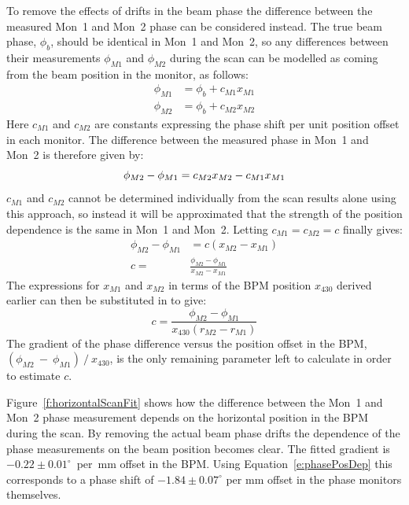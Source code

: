 To remove the effects of drifts in the beam phase the difference between the measured Mon~1 and Mon~2 phase can be considered instead. The true beam phase, \(\phi_b\), should be identical in Mon~1 and Mon~2, so any differences between their measurements \(\phi_{M1}\) and \(\phi_{M2}\) during the scan can be modelled as coming from the beam position in the monitor, as follows:
\begin{align}
\phi_{M1} &= \phi_b + c_{M1}x_{M1} \\
\phi_{M2} &= \phi_b + c_{M2}x_{M2}
\end{align}
Here \(c_{M1}\) and \(c_{M2}\) are constants expressing the phase shift per unit position offset in each monitor. The difference between the measured phase in Mon~1 and Mon~2 is therefore given by:
\begin{equation}
\phi_{M2}-\phi_{M1} = c_{M2}x_{M2} - c_{M1}x_{M1} \\
\end{equation}
\(c_{M1}\) and \(c_{M2}\) cannot be determined individually from the scan results alone using this approach, so instead it will be approximated that the strength of the position dependence is the same in Mon~1 and Mon~2. Letting \(c_{M1} = c_{M2} = c\) finally gives:
\begin{align}
\phi_{M2}-\phi_{M1} &= c(x_{M2}-x_{M1}) \\
c = &\frac{\phi_{M2}-\phi_{M1}}{x_{M2}-x_{M1}} 
\end{align}
The expressions for \(x_{M1}\) and \(x_{M2}\) in terms of the BPM position \(x_{430}\) derived earlier can then be substituted in to give:
\begin{equation}
c = \frac{\phi_{M2}-\phi_{M1}}{x_{430}(r_{M2}-r_{M1})}
\label{e:phasePosDep}
\end{equation}
The gradient of the phase difference versus the position offset in the BPM, \((\phi_{M2}~-~\phi_{M1})~/~x_{430}\), is the only remaining parameter left to calculate in order to estimate \(c\).

Figure~\ref{f:horizontalScanFit} shows how the difference between the Mon~1 and Mon~2 phase measurement depends on the horizontal position in the BPM during the scan. By removing the actual beam phase drifts the dependence of the phase measurements on the beam position becomes clear. The fitted gradient is \(-0.22\pm0.01^\circ\)~per~mm offset in the BPM. Using Equation~\ref{e:phasePosDep} this corresponds to a phase shift of \(-1.84\pm0.07^\circ\) per mm offset in the phase monitors themselves.


